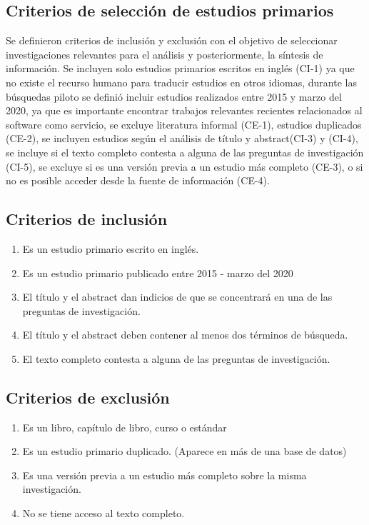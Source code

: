 \documentclass{article}
\begin{document}
\subsection{Criterios de selección de estudios primarios}
Se definieron criterios de inclusión y exclusión con el objetivo 
de seleccionar investigaciones relevantes para el análisis y posteriormente, 
la síntesis de información.
Se incluyen solo estudios primarios escritos en inglés (CI-1) ya que no existe el
recurso humano para traducir estudios en otros idiomas, durante las búsquedas piloto 
se definió incluir estudios realizados entre 2015 y marzo del 2020, ya que es importante
encontrar trabajos relevantes recientes relacionados al software como servicio, 
se excluye literatura informal (CE-1), estudios duplicados (CE-2), se incluyen 
estudios según el análisis de título y abstract(CI-3) y (CI-4),
se incluye si el texto completo contesta a alguna de las preguntas de investigación (CI-5), 
se excluye si es una versión previa a un estudio más completo (CE-3), o si no es posible acceder desde la fuente 
de información (CE-4).


\subsection{Criterios de inclusión}
\begin{enumerate}[C-1.-]
  \item{Es un estudio primario escrito en inglés.}
  \item{Es un estudio primario publicado entre 2015 - marzo del 2020}
  \item{El título y el abstract dan indicios de que se concentrará en una de las preguntas de investigación.}
  \item{El título y el abstract deben contener al menos dos términos de búsqueda.}
  \item{El texto completo contesta a alguna de las preguntas de investigación.}
\end{enumerate}

\subsection{Criterios de exclusión}
\begin{enumerate}[CE-1.-]
  \item{Es un libro, capítulo de libro, curso o estándar}
  \item{Es un estudio primario duplicado. (Aparece en más de una base de datos)}
  \item{Es una versión previa a un estudio más completo sobre la misma investigación.}
  \item{No se tiene acceso al texto completo.}
\end{enumerate}
\newpage
\end{document}
